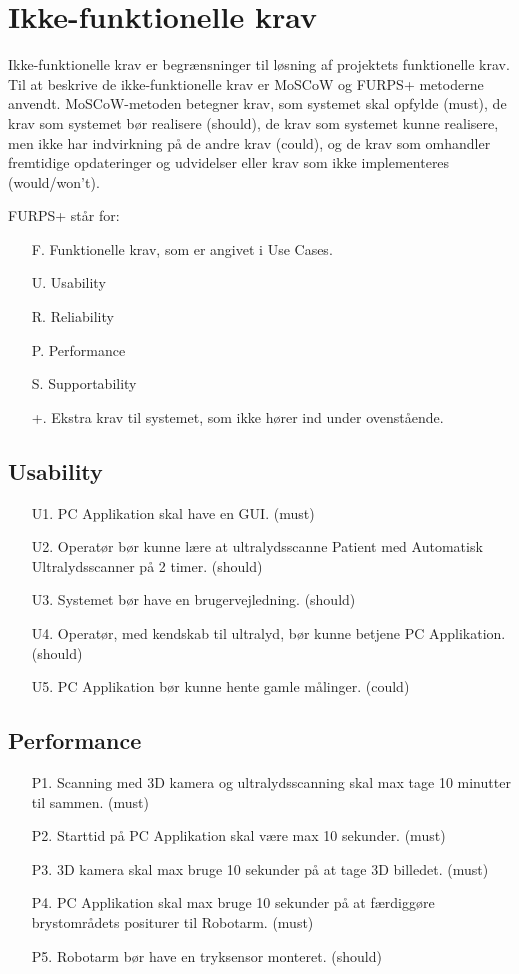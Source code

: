 \chapter{Ikke-funktionelle krav}\label{Ikkefunktionellekrav}

Ikke-funktionelle krav er begrænsninger til løsning af projektets funktionelle krav. Til at beskrive de ikke-funktionelle krav er MoSCoW og FURPS+ metoderne anvendt. 
MoSCoW-metoden betegner krav, som systemet skal opfylde (must), de krav som systemet bør realisere (should), de krav som systemet kunne realisere, men ikke har indvirkning på de andre krav (could), og de krav som omhandler fremtidige opdateringer og udvidelser eller krav som ikke implementeres  (would/won't).
  
FURPS+ står for:
\begin{enumerate}
\item[F.] Funktionelle krav, som er angivet i Use Cases.
\item[U.] Usability
\item[R.] Reliability
\item[P.] Performance 
\item[S.] Supportability 
\item[+.] Ekstra krav til systemet, som ikke hører ind under ovenstående. 
\end{enumerate}

\section{Usability}
\begin{enumerate}
    \item[U1.] PC Applikation skal have en GUI. (must)
    \item[U2.] Operatør bør kunne lære at ultralydsscanne Patient med Automatisk Ultralydsscanner på 2 timer. (should)
    \item[U3.] Systemet bør have en brugervejledning.  (should)  
    \item[U4.] Operatør, med kendskab til ultralyd, bør kunne betjene PC Applikation. (should)
    \item[U5.] PC Applikation bør kunne hente gamle målinger. (could)
\end{enumerate}

\section{Performance}
\begin{enumerate}
    \item[P1.] Scanning med 3D kamera og ultralydsscanning skal max tage 10 minutter til sammen. (must) 
    \item[P2.] Starttid på PC Applikation skal være max 10 sekunder. (must)
    \item[P3.] 3D kamera skal max bruge 10 sekunder på at tage 3D billedet. (must)
    \item[P4.] PC Applikation skal max bruge 10 sekunder på at færdiggøre brystområdets positurer til Robotarm. (must)
    \item[P5.] Robotarm bør have en tryksensor monteret. (should)
\end{enumerate}

